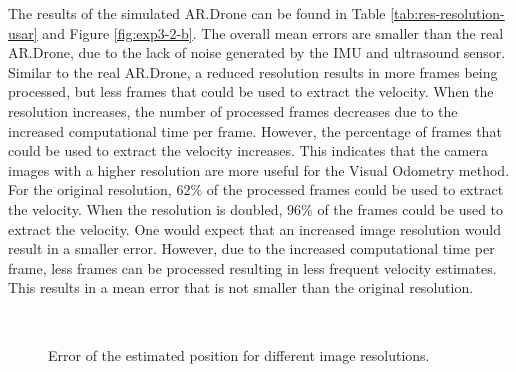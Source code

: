 The results of the simulated AR.Drone can be found in Table \ref{tab:res-resolution-usar} and Figure \ref{fig:exp3-2-b}.
The overall mean errors are smaller than the real AR.Drone, due to the lack of noise generated by the IMU and ultrasound sensor.
Similar to the real AR.Drone, a reduced resolution results in more frames being processed, but less frames that could be used to extract the velocity.
When the resolution increases, the number of processed frames decreases due to the increased computational time per frame.
However, the percentage of frames that could be used to extract the velocity increases.
This indicates that the camera images with a higher resolution are more useful for the Visual Odometry method.
For the original resolution, $62\%$ of the processed frames could be used to extract the velocity. When the resolution is doubled, $96\%$ of the frames could be used to extract the velocity.
One would expect that an increased image resolution would result in a smaller error.
However, due to the increased computational time per frame, less frames can be processed resulting in less frequent velocity estimates.
This results in a mean error that is not smaller than the original resolution.

\begin{figure}[htb!]
  \begin{center}
\\

 \end{center}
  \caption{Error of the estimated position for different image resolutions.}
  \label{fig:exp3-error}
\end{figure}




